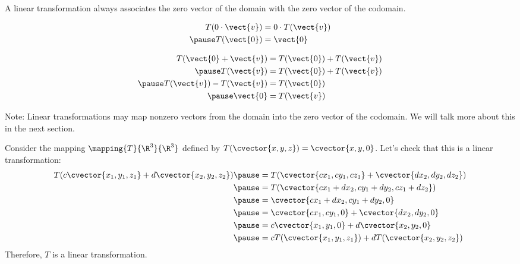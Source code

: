 \documentclass{beamer}
\begin{document}
\begin{frame}
\begin{block}{}
A linear transformation always associates the zero vector of the domain with the zero vector of the codomain.
\end{block}\pause
\begin{example}
\begin{equation*}
\begin{aligned}
T(0\cdot \vect{v}) &= 0\cdot T(\vect{v}) \\\pause
T(\vect{0}) &= \vect{0}
\end{aligned}
\end{equation*}
\end{example}\pause
\begin{example}
\begin{equation*}
\begin{aligned}
T(\vect{0} + \vect{v}) &= T(\vect{0}) + T(\vect{v}) \\\pause
T(\vect{v}) &= T(\vect{0})+T(\vect{v})\\\pause
T(\vect{v})-T(\vect{v}) &= T(\vect{0})\\\pause
\vect{0} &= T(\vect{v})
\end{aligned}
\end{equation*}
\end{example}\pause
\begin{block}{}
Note: Linear transformations may map nonzero vectors from the domain into the zero vector of the codomain. We will talk more about this in the next section.
\end{block}
\end{frame}

\begin{frame}
\begin{example}
Consider the mapping $\mapping{T}{\R^3}{\R^3}$ defined by $T(\cvector{x,y,z})=\cvector{x,y,0}$. Let's check that this is a linear transformation:\pause
\begin{equation*}
\begin{aligned}
T(c\cvector{x_1, y_1, z_1}+d\cvector{x_2, y_2, z_2})\pause
&= T(\cvector{c x_1, c y_1, c z_1}+\cvector{d x_2, d y_2, d z_2})\\\pause
&=T(\cvector{c x_1 + d x_2, c y_1 + d y_2 , c z_1 + d z_2})\\\pause
&=\cvector{c x_1 + d x_2, c y_1 + d y_2, 0}\\\pause
&=\cvector{c x_1, c y_1, 0}+\cvector{d x_2, d y_2, 0}\\\pause
&=c\cvector{x_1, y_1, 0}+d\cvector{x_2, y_2, 0}\\\pause
&=cT(\cvector{x_1, y_1, z_1})+dT(\cvector{x_2, y_2, z_2})
\end{aligned}
\end{equation*}\pause
Therefore, $T$ is a linear transformation.
\end{example}
\end{frame}
\end{document}
